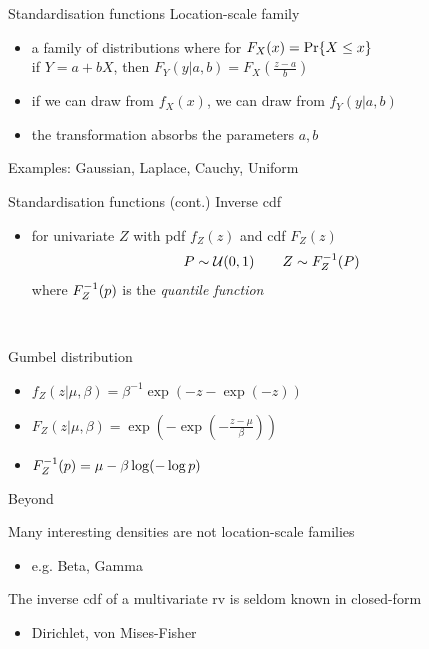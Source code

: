 \documentclass[14pt,dvipsnames]{beamer}
\begin{document}
\begin{frame}{Standardisation functions}
	Location-scale family
	\begin{itemize}
		\item a family of distributions where for $F_X(x) = \operatorname{Pr}\{X \le x\}$ \\
		if $Y=a + b X$, then  $F_Y(y|a, b)=F_X(\frac{z-a}{b})$ \pause
		\item if we can draw from $f_X(x)$, we can draw from $f_Y(y|a,b)$ \pause
		\item the transformation absorbs the parameters $a, b$
	\end{itemize}
	
	\pause
	
	Examples: Gaussian, Laplace, Cauchy, Uniform
	
\end{frame}

\begin{frame}{Standardisation functions (cont.)}
	Inverse cdf
	\begin{itemize}
		\item for univariate $Z$ with pdf $f_Z(z)$ and cdf $F_Z(z)$
		\begin{equation*}
		\begin{aligned}
			P \sim \mathcal U(0, 1) \qquad Z \sim {F}^{-1}_Z(P) 
		\end{aligned}		
		\end{equation*}
		where ${F}^{-1}_Z(p)$ is the \emph{quantile function}
	\end{itemize}
	
	~ \pause
	
	Gumbel distribution
	\begin{itemize}
		\item $f_Z(z|\mu, \beta) = \beta^{-1}\exp(-z -\exp(-z))$ 
		\item $F_Z(z|\mu, \beta) = \exp(-\exp(-\frac{z-\mu}{\beta}))$
		\item ${F}^{-1}_Z(p) = \mu - \beta \log( - \log p)$
	\end{itemize}
\end{frame}

\begin{frame}{Beyond}

	Many interesting densities are not location-scale families
	\begin{itemize}
		\item e.g. Beta, Gamma
	\end{itemize} \pause
	
	The inverse cdf of a multivariate rv is seldom known in closed-form
	\begin{itemize}
		\item Dirichlet, von Mises-Fisher
	\end{itemize}

\end{frame}
\end{document}
